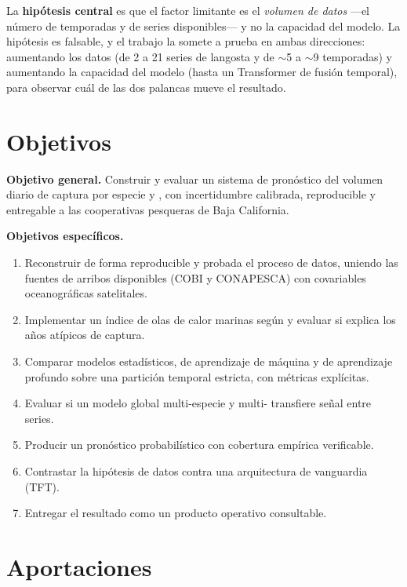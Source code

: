 La \textbf{hipótesis central} es que el factor limitante es el \emph{volumen de datos} ---el
número de temporadas y de series disponibles--- y no la capacidad del modelo. La hipótesis es
falsable, y el trabajo la somete a prueba en ambas direcciones: aumentando los datos (de 2 a
21 series de langosta y de $\sim$5 a $\sim$9 temporadas) y aumentando la capacidad del modelo
(hasta un Transformer de fusión temporal), para observar cuál de las dos palancas mueve el
resultado.

\section{Objetivos}

\noindent\textbf{Objetivo general.} Construir y evaluar un sistema de pronóstico del volumen
diario de captura por especie y \ue{}, con incertidumbre calibrada, reproducible y entregable
a las cooperativas pesqueras de Baja California.

\noindent\textbf{Objetivos específicos.}
\begin{enumerate}
  \item Reconstruir de forma reproducible y probada el proceso de datos, uniendo las fuentes
  de arribos disponibles (COBI y CONAPESCA) con covariables oceanográficas satelitales.
  \item Implementar un índice de olas de calor marinas según \citet{hobday2016} y evaluar si
  explica los años atípicos de captura.
  \item Comparar modelos estadísticos, de aprendizaje de máquina y de aprendizaje profundo
  sobre una partición temporal estricta, con métricas explícitas.
  \item Evaluar si un modelo global multi-especie y multi-\ue{} transfiere señal entre series.
  \item Producir un pronóstico probabilístico con cobertura empírica verificable.
  \item Contrastar la hipótesis de datos contra una arquitectura de vanguardia (TFT).
  \item Entregar el resultado como un producto operativo consultable.
\end{enumerate}

\section{Aportaciones}

